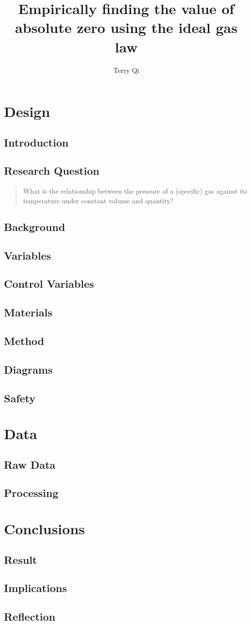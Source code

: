 \documentclass[a4paper,12pt]{article}
\title{Empirically finding the value of absolute zero using the ideal gas law}
\author{Terry Qi}
\begin{document}
\maketitle

\section{Design}
\subsection{Introduction}
\subsection{Research Question}
\begin{quote}
    What is the relationship between the pressure of a (specific) gas against its temperature under constant volume and quantity?
\end{quote}

\subsection{Background}
\subsection{Variables}
\subsection{Control Variables}
\subsection{Materials}
\subsection{Method}
\subsection{Diagrams}
\subsection{Safety}

\section{Data}
\subsection{Raw Data}
\subsection{Processing}

\section{Conclusions}
\subsection{Result}
\subsection{Implications}
\subsection{Reflection}
\end{document}
